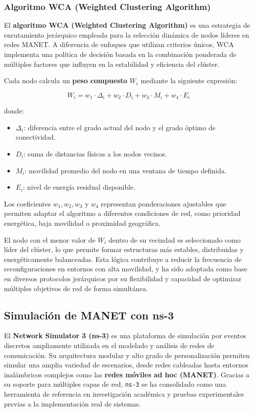 \documentclass{article}
\begin{document}
\subsubsection{Algoritmo WCA (Weighted Clustering Algorithm)}

El \textbf{algoritmo WCA (Weighted Clustering Algorithm)} es una estrategia de enrutamiento jerárquico empleada para la selección dinámica de nodos líderes en redes MANET. A diferencia de enfoques que utilizan criterios únicos, WCA implementa una política de decisión basada en la combinación ponderada de múltiples factores que influyen en la estabilidad y eficiencia del clúster.

Cada nodo calcula un \textbf{peso compuesto} $W_i$ mediante la siguiente expresión:

\[
W_i = w_1 \cdot \Delta_i + w_2 \cdot D_i + w_3 \cdot M_i + w_4 \cdot E_i
\]

donde:
\begin{itemize}
    \item $\Delta_i$: diferencia entre el grado actual del nodo y el grado óptimo de conectividad.
    \item $D_i$: suma de distancias físicas a los nodos vecinos.
    \item $M_i$: movilidad promedio del nodo en una ventana de tiempo definida.
    \item $E_i$: nivel de energía residual disponible.
\end{itemize}

Los coeficientes $w_1, w_2, w_3$ y $w_4$ representan ponderaciones ajustables que permiten adaptar el algoritmo a diferentes condiciones de red, como prioridad energética, baja movilidad o proximidad geográfica.

El nodo con el menor valor de $W_i$ dentro de su vecindad es seleccionado como líder del clúster, lo que permite formar estructuras más estables, distribuidas y energéticamente balanceadas. Esta lógica contribuye a reducir la frecuencia de reconfiguraciones en entornos con alta movilidad, y ha sido adoptada como base en diversos protocolos jerárquicos por su flexibilidad y capacidad de optimizar múltiples objetivos de red de forma simultánea.


\subsection{Simulación de MANET con ns-3}
El \textbf{Network Simulator 3 (ns-3)} es una plataforma de simulación por eventos discretos ampliamente utilizada en el modelado y análisis de redes de comunicación. Su arquitectura modular y alto grado de personalización permiten simular una amplia variedad de escenarios, desde redes cableadas hasta entornos inalámbricos complejos como las \textbf{redes móviles ad hoc (MANET)}. Gracias a su soporte para múltiples capas de red, \texttt{ns-3} se ha consolidado como una herramienta de referencia en investigación académica y pruebas experimentales previas a la implementación real de sistemas.
\end{document}
